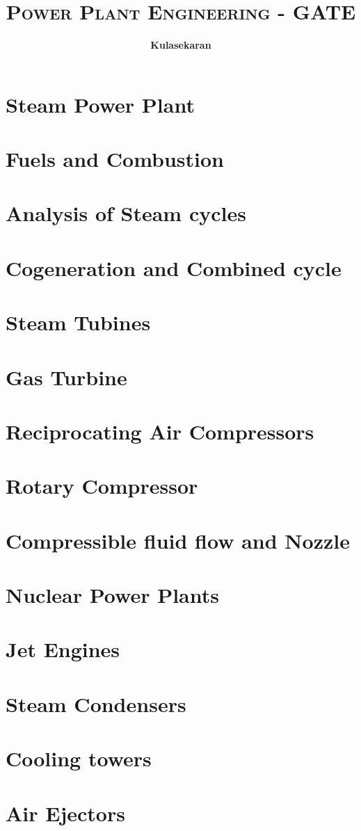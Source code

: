 \documentclass[8pt]{report}
\title{\Huge{\textsc{Power Plant Engineering - GATE}}}
\author{\huge{\textbf{Kulasekaran}}}
\begin{document}
\maketitle
\tableofcontents
\chapter{Steam Power Plant}
\chapter{Fuels and Combustion}
\chapter{Analysis of Steam cycles}
\chapter{Cogeneration and Combined cycle}
\chapter{Steam Tubines}
\chapter{Gas Turbine}
\chapter{Reciprocating Air Compressors}
\chapter{Rotary Compressor}
\chapter{Compressible fluid flow and Nozzle}
\chapter{Nuclear Power Plants}
\chapter{Jet Engines}
\chapter{Steam Condensers}
\chapter{Cooling towers}
\chapter{Air Ejectors}
\end{document}
